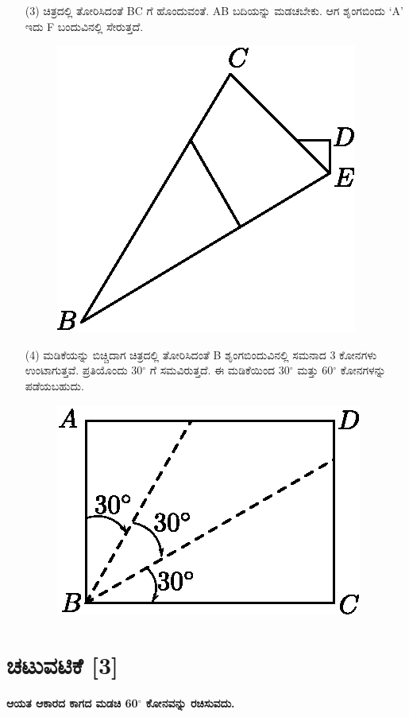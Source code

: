 \begin{enumerate}
\item[(3)] ಚಿತ್ರದಲ್ಲಿ ತೋರಿಸಿದಂತೆ  BC ಗೆ ಹೊಂದುವಂತೆ.  AB ಬದಿಯನ್ನು ಮಡಚಬೇಕು.  ಆಗ ಶೃಂಗಬಿಂದು `A' ಇದು  F ಬಂದುವಿನಲ್ಲಿ ಸೇರುತ್ತದೆ. 
\begin{figure}[H]
\centering
\includegraphics[scale=.98]{src/figure/chap1/fig1-8c.eps}
\end{figure}

\item[(4)] ಮಡಿಕೆಯನ್ನು ಬಿಚ್ಚಿದಾಗ ಚಿತ್ರದಲ್ಲಿ ತೋರಿಸಿದಂತೆ B ಶೃಂಗಬಿಂದುವಿನಲ್ಲಿ ಸಮನಾದ  3 ಕೋನಗಳು ಉಂಟಾಗುತ್ತವೆ. ಪ್ರತಿಯೊಂದು 30$^\circ$ ಗೆ ಸಮವಿರುತ್ತದೆ. ಈ ಮಡಿಕೆಯಿಂದ 30$^\circ$ ಮತ್ತು 60$^\circ$ ಕೋನಗಳನ್ನು ಪಡೆಯಬಹುದು. 
\begin{figure}[H]
\centering
\includegraphics[scale=.98]{src/figure/chap1/fig1-8d.eps}
\end{figure}
\end{enumerate}

\section*{ಚಟುವಟಿಕೆ [3]} \textbf{ಆಯತ ಆಕಾರದ ಕಾಗದ ಮಡಚಿ 60$^\circ$ ಕೋನವನ್ನು ರಚಿಸುವದು.}

